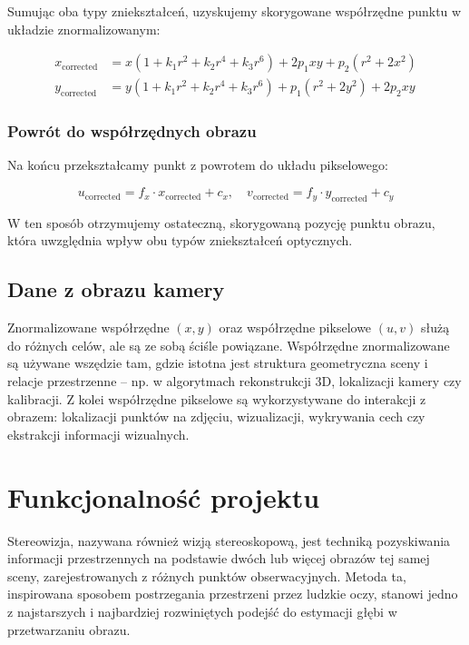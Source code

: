 \documentclass[magisterska]{pracadypl}
\begin{document}
Sumując oba typy zniekształceń, uzyskujemy skorygowane współrzędne punktu w układzie znormalizowanym:

\begin{align*}
x_{\text{corrected}} &= x(1 + k_1 r^2 + k_2 r^4 + k_3 r^6) + 2p_1 x y + p_2 (r^2 + 2x^2) \\
y_{\text{corrected}} &= y(1 + k_1 r^2 + k_2 r^4 + k_3 r^6) + p_1 (r^2 + 2y^2) + 2p_2 x y
\end{align*}

\subsection*{Powrót do współrzędnych obrazu}

Na końcu przekształcamy punkt z powrotem do układu pikselowego:

\[
u_{\text{corrected}} = f_x \cdot x_{\text{corrected}} + c_x, \quad
v_{\text{corrected}} = f_y \cdot y_{\text{corrected}} + c_y
\]

W ten sposób otrzymujemy ostateczną, skorygowaną pozycję punktu obrazu, która uwzględnia wpływ obu typów zniekształceń optycznych.

\section{Dane z obrazu kamery}

Znormalizowane współrzędne $(x, y)$ oraz współrzędne pikselowe $(u, v)$ służą do różnych celów, ale są ze sobą ściśle powiązane. Współrzędne znormalizowane są używane wszędzie tam, gdzie istotna jest struktura geometryczna sceny i relacje przestrzenne – np. w algorytmach rekonstrukcji 3D, lokalizacji kamery czy kalibracji. Z kolei współrzędne pikselowe są wykorzystywane do interakcji z obrazem: lokalizacji punktów na zdjęciu, wizualizacji, wykrywania cech czy ekstrakcji informacji wizualnych.


\chapter{Funkcjonalność projektu}

Stereowizja, nazywana również wizją stereoskopową, jest techniką pozyskiwania informacji przestrzennych na podstawie dwóch lub więcej obrazów tej samej sceny, zarejestrowanych z różnych punktów obserwacyjnych. Metoda ta, inspirowana sposobem postrzegania przestrzeni przez ludzkie oczy, stanowi jedno z najstarszych i najbardziej rozwiniętych podejść do estymacji głębi w przetwarzaniu obrazu.
\end{document}

